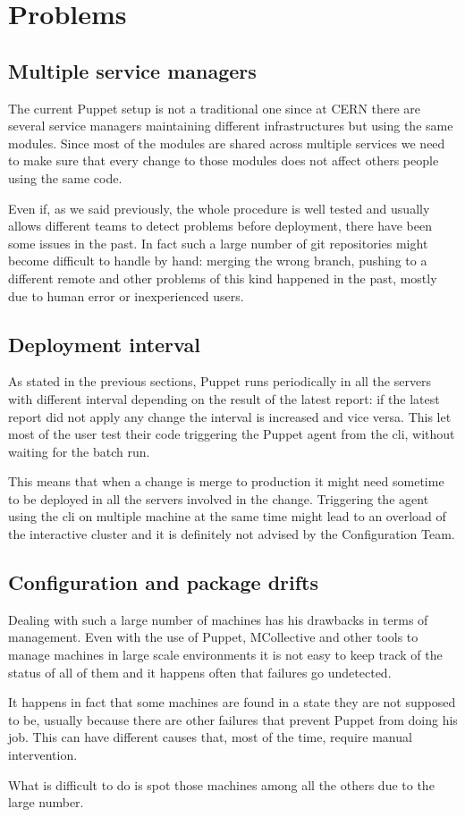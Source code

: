 \section{Problems}

\subsection{Multiple service managers}

The current Puppet setup is not a traditional one since at CERN there are
several service managers maintaining different infrastructures but using
the same modules. Since most of the modules are shared across multiple
services we need to make sure that every change to those modules does not
affect others people using the same code.

Even if, as we said previously, the whole procedure is well tested and
usually allows different teams to detect problems before deployment, there
have been some issues in the past. In fact such a large number of git
repositories might become difficult to handle by hand: merging the wrong
branch, pushing to a different remote and other problems of this kind
happened in the past, mostly due to human error or inexperienced users.

\subsection{Deployment interval}

As stated in the previous sections, Puppet runs periodically in all the
servers with different interval depending on the result of the latest
report: if the latest report did not apply any change the interval is
increased and vice versa. This let most of the user test their code
triggering the Puppet agent from the cli, without waiting for the batch
run.

This means that when a change is merge to production it might need
sometime to be deployed in all the servers involved in the change.
Triggering the agent using the cli on multiple machine at the same time
might lead to an overload of the interactive cluster and it is definitely
not advised by the Configuration Team.

\subsection{Configuration and package drifts}

Dealing with such a large number of machines has his drawbacks in terms of
management. Even with the use of Puppet, MCollective and other tools to
manage machines in large scale environments it is not easy to keep track
of the status of all of them and it happens often that failures go
undetected.

It happens in fact that some machines are found in a state they are not
supposed to be, usually because there are other failures that prevent
Puppet from doing his job. This can have different causes that, most of
the time, require manual intervention.

What is difficult to do is spot those machines among all the others due to
the large number.

